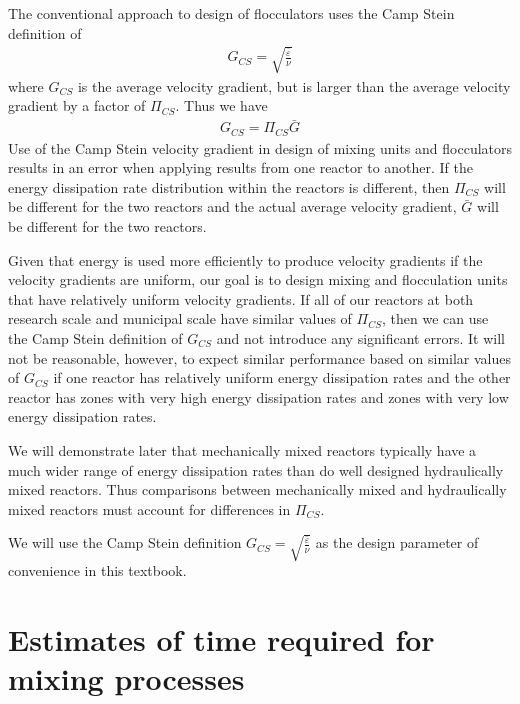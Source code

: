 \documentclass[letterpaper,10pt,english]{sphinxmanual}
\begin{document}
The conventional approach to design of flocculators uses the Camp Stein definition of
\begin{equation}\label{equation:Rapid_Mix/RM_Derivations:Rapid_Mix/RM_Derivations:33}
\begin{split}G_{CS} = \sqrt{\frac{\bar\varepsilon}{\nu}}\end{split}
\end{equation}
where \(G_{CS}\) is  the average velocity gradient, but is larger than the average velocity gradient by a factor of \(\Pi_{CS}\). Thus we have
\begin{equation}\label{equation:Rapid_Mix/RM_Derivations:Rapid_Mix/RM_Derivations:34}
\begin{split}G_{CS} = \Pi_{CS}\bar G\end{split}
\end{equation}
Use of the Camp Stein velocity gradient in design of mixing units and flocculators results in an error when applying results from one reactor to another. If the energy dissipation rate distribution within the reactors is different, then \(\Pi_{CS}\) will be different for the two reactors and the actual average velocity gradient, \(\bar G\) will be different for the two reactors.

Given that energy is used more efficiently to produce velocity gradients if the velocity gradients are uniform, our goal is to design mixing and flocculation units that have relatively uniform velocity gradients. If all of our reactors at both research scale and municipal scale have similar values of \(\Pi_{CS}\), then we can use the Camp Stein definition of \(G_{CS}\) and not introduce any significant errors. It will not be reasonable, however, to expect similar performance based on similar values of \(G_{CS}\) if one reactor has relatively uniform energy dissipation rates and the other reactor has zones with very high energy dissipation rates and zones with very low energy dissipation rates.

We will demonstrate later that mechanically mixed reactors typically have a much wider range of energy dissipation rates than do well designed hydraulically mixed reactors. Thus comparisons between mechanically mixed and hydraulically mixed reactors must account for differences in \(\Pi_{CS}\).

We will use the Camp Stein definition \(G_{CS} = \sqrt{\frac{\bar\varepsilon}{\nu}}\) as the design parameter of convenience in this textbook.


\section{Estimates of time required for mixing processes}
\label{\detokenize{Rapid_Mix/RM_Derivations:estimates-of-time-required-for-mixing-processes}}\label{\detokenize{Rapid_Mix/RM_Derivations:heading-estimates-of-time-required-for-mixing-processes}}
\end{document}
